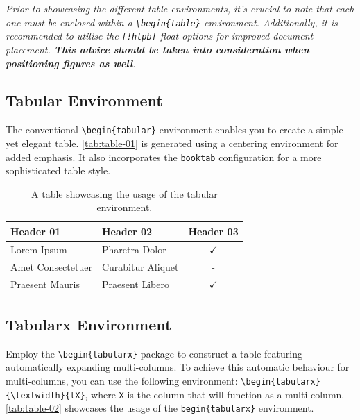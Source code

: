 {\begin{block}[tip]
\textit{Prior to showcasing the different table environments, it's crucial to note that each one must be enclosed within a \texttt{\textbackslash begin\{table\}} environment. Additionally, it is recommended to utilise the \texttt{[!htpb]} float options for improved document placement. \textbf{This advice should be taken into consideration when positioning figures as well}.}
\end{block}

\subsection{Tabular Environment}
The conventional \verb|\begin{tabular}| environment enables you to create a simple yet elegant table. \autoref{tab:table-01} is generated using a centering environment for added emphasis. It also incorporates the \verb|booktab| configuration for a more sophisticated table style.

\begin{table}[!htpb]
    \caption{A table showcasing the usage of the tabular environment.}
    \label{tab:table-01}
    \centering
    \begin{tabular}{llc}
        \toprule
        \textbf{Header 01} & \textbf{Header 02} & \textbf{Header 03} \\ 
        \midrule
        Lorem Ipsum         & Pharetra Dolor    & $\checkmark$  \\
        Amet Consectetuer   & Curabitur Aliquet & -             \\
        Praesent Mauris     & Praesent Libero   & $\checkmark$  \\
        \bottomrule
    \end{tabular}
\end{table}

\subsection{Tabularx Environment}
Employ the \verb|\begin{tabularx}| package to construct a table featuring automatically expanding multi-columns. To achieve this automatic behaviour for multi-columns, you can use the following environment: \verb|\begin{tabularx}{\textwidth}{lX}|, where \verb|X| is the column that will function as a multi-column. \autoref{tab:table-02} showcases the usage of the \verb|begin{tabularx}| environment.

}

